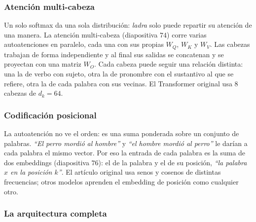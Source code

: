 \documentclass[11pt,letterpaper]{article}
\begin{document}
\subsubsection*{Atención multi-cabeza}

Un solo softmax da una sola distribución: \textit{ladra} solo puede
repartir su atención de una manera. La atención multi-cabeza
(diapositiva $74$) corre varias autoatenciones en paralelo, cada una
con sus propias $W_Q$, $W_K$ y $W_V$. Las cabezas trabajan de forma
independiente y al final sus salidas se concatenan y se proyectan con
una matriz $W_O$. Cada cabeza puede seguir una relación distinta: una
la de verbo con sujeto, otra la de pronombre con el sustantivo al que
se refiere, otra la de cada palabra con sus vecinas. El Transformer
original usa $8$ cabezas de $d_k = 64$.

\subsubsection*{Codificación posicional}

La autoatención no ve el orden: es una suma ponderada sobre un
conjunto de palabras. \textit{``El perro mordió al hombre''} y
\textit{``el hombre mordió al perro''} le darían a cada palabra el
mismo vector. Por eso la entrada de cada palabra es la suma de dos
embeddings (diapositiva $76$): el de la palabra y el de su posición,
\textit{``la palabra $x$ en la posición $k$''}. El artículo original
usa senos y cosenos de distintas frecuencias; otros modelos aprenden
el embedding de posición como cualquier otro.

\subsubsection*{La arquitectura completa}
\end{document}
